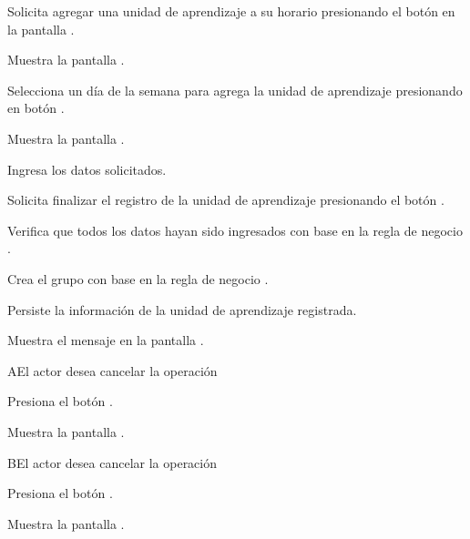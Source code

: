\begin{UCtrayectoria}

    \UCpaso[\UCactor] Solicita agregar una unidad de aprendizaje a su horario presionando el botón \btnEditar en la pantalla .
    
    \UCpaso[\UCsist] Muestra la pantalla .
    
    \UCpaso[\UCactor] Selecciona un día de la semana para agrega la unidad de aprendizaje presionando en botón \btnAgregar. 
    
    \UCpaso[\UCsist] Muestra la pantalla .
    
    \UCpaso[\UCactor] \label{CUH1.1:Registrar} Ingresa los datos solicitados. 
    
    \UCpaso[\UCactor] Solicita finalizar el registro de la unidad de aprendizaje presionando el botón .
    
    \UCpaso[\UCsist] Verifica que todos los datos hayan sido ingresados con base en la regla de negocio . 
    
    \UCpaso[\UCsist] Crea el grupo con base en la regla de negocio .
    
    \UCpaso[\UCsist] Persiste la información de la unidad de aprendizaje registrada. 
    
    \UCpaso[\UCsist] Muestra el mensaje  en la pantalla .
        
\end{UCtrayectoria}


\begin{UCtrayectoriaA}{A}{El actor desea cancelar la operación}
	
	\UCpaso[\UCactor] Presiona el botón \btnEditar.
	
	\UCpaso[\UCsist] Muestra la pantalla .
		
\end{UCtrayectoriaA}

\begin{UCtrayectoriaA}{B}{El actor desea cancelar la operación}
	
	\UCpaso[\UCactor] Presiona el botón .
	
	\UCpaso[\UCsist] Muestra la pantalla .
		
\end{UCtrayectoriaA}

